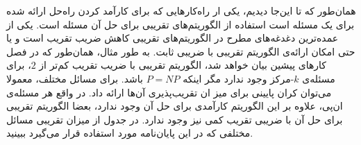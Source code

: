 

همان‌طور که تا این‌جا دیدیم، یکی ار راه‌کارهایی که برای کارآمد کردن راه‌حل ارائه شده برای یک مسئله است استفاده از الگوریتم‌های تقریبی برای حل آن مسئله است. یکی از عمده‌ترین دغدغه‌های مطرح در الگوریتم‌های تقریبی کاهش ضریب تقریب است و یا حتی امکان ارائه‌ی الگوریتم تقریبی با ضریبی ثابت. به طور مثال، همان‌طور که در فصل کارهای پیشین بیان خواهد شد، الگوریتم تقریبی با ضریب تقریب کم‌تر از $2$، برای مسئله‌ی $k$-مرکز وجود ندارد مگر اینکه $P = NP$ باشد. برای مسائل مختلف، معمولا می‌توان کران پایینی برای میز ان تقریب‌پذیری آن‌ها ارائه داد. در واقع هر مسئله‌ی ان‌پی، علاوه بر این الگوریتم کارآمدی برای حل آن وجود ندارد، بعضا الگوریتم تقریبی برای حل آن با ضریبی تقریب کمی نیز وجود ندارد. در جدول  از میزان تقریبی مسائل مختلفی که در این پایان‌نامه مورد استفاده قرار می‌گیرد ببینید.

